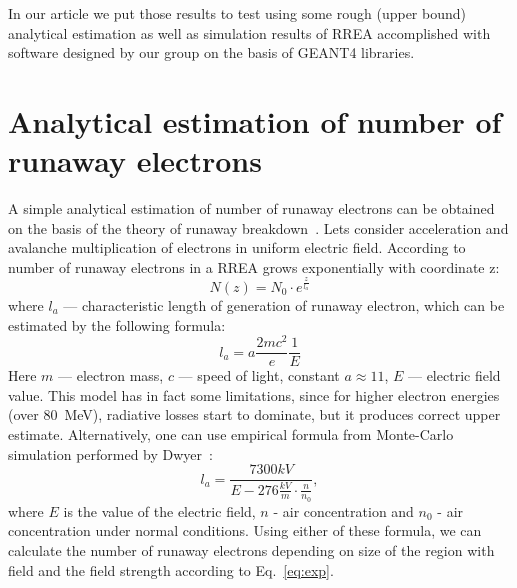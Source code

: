 \documentclass[doublecol,linenumbers]{epl2} %
\begin{document}
In our article we put those results to test using some rough (upper bound) analytical estimation as well as simulation results of RREA accomplished with software designed by our group on the basis of GEANT4 libraries.

\section{Analytical estimation of number of runaway electrons}

A simple analytical estimation of number of runaway electrons can be obtained on the basis of the theory of runaway breakdown~\cite{Gurevich:2001}. Lets consider acceleration and avalanche multiplication of electrons in uniform electric field. According to~\cite{Gurevich:2001} number of runaway electrons in a RREA grows exponentially with coordinate z:
\begin{equation}
\label{eq:exp}
    N(z) = N_0 \cdot e^{\frac{z}{l_a}}
\end{equation}
where $l_a$ --- characteristic length of generation of runaway electron, which can be estimated by the following formula:
\begin{equation}
    l_a = a\frac{2 m c^{2}}{e} \frac{1}{E}
\end{equation}
Here $m$ --- electron mass, $c$ --- speed of light, constant $a \approx 11$, $E$ --- electric field value. This model has in fact some limitations, since for higher electron energies (over 80~MeV), radiative losses start to dominate, but it produces correct upper estimate. 
Alternatively, one can use empirical formula from Monte-Carlo simulation performed by Dwyer~\cite{Dwyer2007}:
\begin{equation}
\label{eq:dwyer}
    l_a = \frac{7300 kV}{E - 276 \frac{kV}{m} \cdot \frac{n}{n_0}},
\end{equation}
where $E$ is the value of the electric field, $n$ - air concentration and $n_0$ - air concentration under normal conditions. Using either of these formula, we can calculate the number of runaway electrons depending on size of the region with field and the field strength according to Eq.~\ref{eq:exp}. 
\end{document}
